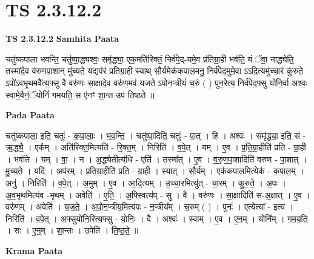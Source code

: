 \documentclass[17pt]{extarticle}
\begin{document}
\section*{ TS 2.3.12.2 }

\textbf{TS 2.3.12.2 } \newline
\textbf{Samhita Paata} \newline

चतु॑ष्कपाला भवन्ति॒ चतु॑ष्पा॒द्ध्यश्वः॒ समृ॑द्ध्या॒ एक॒मति॑रिक्तं॒ निर्व॑पे॒द्-यमे॒व प्र॑तिग्रा॒ही भव॑ति॒ यं ॅवा॒ नाद्ध्येति॒ तस्मा॑दे॒व व॑रुणपा॒शान् मु॑च्यते॒ यद्यप॑रं प्रतिग्रा॒ही स्याथ् सौ॒र्यमेक॑कपाल॒मनु॒ निर्व॑पेद॒मुमे॒वा ऽऽदि॒त्यमु॑च्चा॒रं कु॑रुते॒ ऽपो॑ऽवभृ॒थमवै᳚त्य॒फ्सु वै वरु॑णः सा॒क्षादे॒व वरु॑ण॒मव॑ यजते ऽपोन॒प्त्रीयं॑ च॒रुं ( ) पुन॒रेत्य॒ निर्व॑पेद॒फ्सु यो॑नि॒र्वा अश्वः॒ स्वामे॒वैनं॒ॅयोनिं॑ गमयति॒ स ए॑नꣳ शा॒न्त उप॑ तिष्ठते ॥ \newline

\textbf{Pada Paata} \newline

चतु॑ष्कपाला॒ इति॒ चतुः॑ - क॒पा॒लाः॒ । भ॒व॒न्ति॒ । चतु॑ष्पा॒दिति॒ चतुः॑ - पा॒त् । हि । अश्वः॑ । समृ॑द्ध्या॒ इति॒ सं - ऋ॒द्ध्यै॒ । एक᳚म् । अति॑रिक्त॒मित्यति॑ - रि॒क्त॒म् । निरिति॑ । व॒पे॒त् । यम् । ए॒व । प्र॒ति॒ग्रा॒हीति॑ प्रति - ग्रा॒ही । भव॑ति । यम् । वा॒ । न । अ॒द्ध्येतीत्य॑धि - एति॑ । तस्मा᳚त् । ए॒व । व॒रु॒ण॒पा॒शादिति॑ वरुण - पा॒शात् ।   मु॒च्य॒ते॒ । यदि॑ । अप॑रम् । प्र॒ति॒ग्रा॒हीति॑ प्रति -  ग्रा॒ही । स्यात् । सौ॒र्यम् । एक॑कपाल॒मित्येक॑ - क॒पा॒ल॒म् । अनु॑ । निरिति॑ । व॒पे॒त् । अ॒मुम् । ए॒व । आ॒दि॒त्यम् । उ॒च्चा॒रमित्यु॑त् - चा॒रम् । कु॒रु॒ते॒ । अ॒पः । अ॒व॒भृ॒थमित्य॑व -भृ॒थम् । अवेति॑ । ए॒ति॒ । अ॒फ्स्वित्य॑प् - सु । वै । वरु॑णः । सा॒क्षादिति॑ स-अ॒क्षात् । ए॒व । वरु॑णम् । अवेति॑ । य॒ज॒ते॒ । अ॒पो॒न॒प्त्रीय॒मित्य॑पः - न॒प्त्रीय᳚म् । च॒रुम् ( ) । पुनः॑ । एत्येत्या᳚ - इत्य॑ । निरिति॑ । व॒पे॒त् । अ॒फ्सुयो॑नि॒रित्य॒फ्सु - यो॒निः॒ । वै । अश्वः॑ । स्वाम् । ए॒व । ए॒न॒म् । योनि᳚म् । ग॒म॒य॒ति॒ । सः । ए॒न॒म् । शा॒न्तः । उपेति॑ । ति॒ष्ठ॒ते॒ ॥  \newline


\textbf{Krama Paata} \newline
\end{document}
